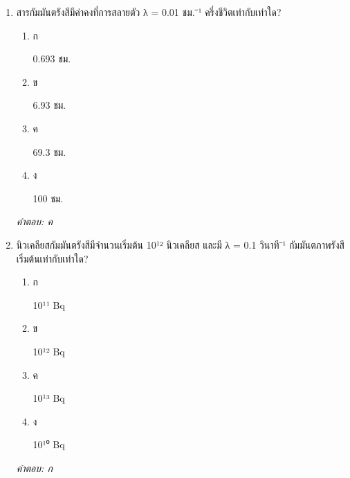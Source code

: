 \documentclass[12pt]{article}
\begin{document}
\begin{enumerate}[label=\arabic*., itemsep=0.5\baselineskip, topsep=0.5\baselineskip, leftmargin=*]
\item สารกัมมันตรังสีมีค่าคงที่การสลายตัว λ = 0.01 ชม.⁻¹ ครึ่งชีวิตเท่ากับเท่าใด?
\begin{enumerate}[label=\alph*)., itemsep=0.3\baselineskip, topsep=0.3\baselineskip]
\item ก\ 
\begin{minipage}[t]{0.9\linewidth}
\raggedright 0.693 ชม.
\end{minipage}
\item ข\ 
\begin{minipage}[t]{0.9\linewidth}
\raggedright 6.93 ชม.
\end{minipage}
\item ค\ 
\begin{minipage}[t]{0.9\linewidth}
\raggedright 69.3 ชม.
\end{minipage}
\item ง\ 
\begin{minipage}[t]{0.9\linewidth}
\raggedright 100 ชม.
\end{minipage}
\end{enumerate}
\vspace{-0.3\baselineskip}
\begin{small}
\textit{คำตอบ: ค}
\end{small}

\item นิวเคลียสกัมมันตรังสีมีจำนวนเริ่มต้น 10¹² นิวเคลียส และมี λ = 0.1 วินาที⁻¹ กัมมันตภาพรังสีเริ่มต้นเท่ากับเท่าใด?
\begin{enumerate}[label=\alph*)., itemsep=0.3\baselineskip, topsep=0.3\baselineskip]
\item ก\ 
\begin{minipage}[t]{0.9\linewidth}
\raggedright 10¹¹ Bq
\end{minipage}
\item ข\ 
\begin{minipage}[t]{0.9\linewidth}
\raggedright 10¹² Bq
\end{minipage}
\item ค\ 
\begin{minipage}[t]{0.9\linewidth}
\raggedright 10¹³ Bq
\end{minipage}
\item ง\ 
\begin{minipage}[t]{0.9\linewidth}
\raggedright 10¹⁰ Bq
\end{minipage}
\end{enumerate}
\vspace{-0.3\baselineskip}
\begin{small}
\textit{คำตอบ: ก}
\end{small}

\end{enumerate}
\end{document}
